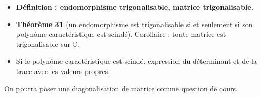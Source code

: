\documentclass[twoside,a4paper,french,10pt]{VcCours}
\begin{document}
\begin{enumerate}
\begin{itemize}
\item \textbf{Définition : endomorphisme trigonalisable, matrice trigonalisable.}
\item \textbf{Théorème 31} (un endomorphisme est trigonalisable si et seulement si son polynôme caractéristique est scindé). Corollaire : toute matrice est trigonalisable sur $\mathbb{C}$.
\item Si le polynôme caractéristique est scindé, expression du déterminant et de la trace avec les valeurs propres. 
\end{itemize}
\end{enumerate}


    
\begin{Exercice} 
  On pourra poser une diagonalisation de matrice comme question de cours.
\end{Exercice} 
    
  
\end{document}
